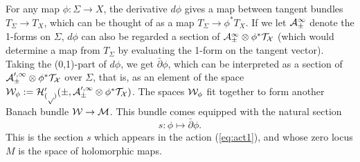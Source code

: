 For any map
$\phi:\Sigma\to X$, the derivative $d\phi$ gives a map between tangent
bundles $T_\Sigma\to T_X$, which can be thought of as a map
$T_\Sigma\to\phi^*T_X$.  If we let $\cal A^1_\Sigma$ denote the 1-forms
on $\Sigma$, $d\phi$ can also be regarded a section of
$\cal A^1_\Sigma\otimes\phi^*T_X$ (which would determine a map from $T_\Sigma$
by evaluating the 1-form on the tangent vector).  Taking the
(0,1)-part of $d\phi$, we get
$\bar\partial\phi$, which can be interpreted as a section of
$\cal A^{0,1}_\Sigma\otimes\phi^*T_X$ over $\Sigma$, that is, as an
element of the space
$\cal{W}_\phi:=H^0_{(p)}(\Sigma,\cal A^{0,1}_\Sigma\otimes\phi^*T_X)$.
The spaces $\cal{W}_\phi$
fit together to form another Banach bundle $\cal{W}\to\cal{M}$.
This bundle comes equipped with the natural section
\begin{equation}
  s:\phi\mapsto \bar\partial\phi.
\end{equation}
This is the section $s$ which appears in the action (\ref{eq:act1}), and
whose zero locus $M$ is the space of holomorphic maps.

